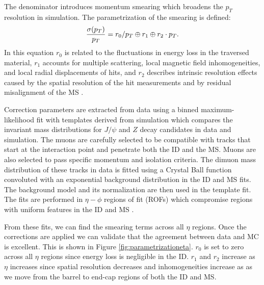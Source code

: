 \par \hspace{20pt} The denominator introduces momentum smearing which broadens the $p_T$ resolution in simulation. The parametrization of the smearing is defined:
\begin{align*}
	\centering 
    \frac{\sigma(p_T)}{p_T} = r_0/p_T \oplus r_1 \oplus r_2 \cdot p_T .
\end{align*}
In this equation $r_0$ is related to the fluctuations in energy loss in the traversed material, $r_1$ accounts for multiple scattering, local magnetic field inhomogeneities, and local radial displacements of hits, and $r_2$ describes intrinsic resolution effects caused by the spatial resolution of the hit measurements and by residual misalignment of the MS \cite{MCPpaper}. 

\par \hspace{20pt} Correction parameters are extracted from data using a binned maximum-likelihood fit with templates derived from simulation which compares the invariant mass distributions for $J/\psi$ and $Z$ decay candidates in data and simulation. The muons are carefully selected to be compatible with tracks that start at the interaction point and penetrate both the ID and the MS. Muons are also selected to pass specific momentum and isolation criteria. The dimuon mass distribution of these tracks in data is fitted using a Crystal Ball function convoluted with an exponential background distribution in the ID and MS fits. The background model and its normalization are then used in the template fit. The fits are performed in $\eta-\phi$ regions of fit (ROFs) which compromise regions with uniform features in the ID and MS \cite{MCPpaper}. 

\par \hspace{20pt} From these fits, we can find the smearing terms across all $\eta$ regions. Once the corrections are applied we can validate that the agreement between data and MC is excellent. This is shown in Figure \ref{fig:parametrizationeta}. $r_0$ is set to zero across all $\eta$ regions since energy loss is negligible in the ID. $r_1$ and $r_2$ increase as $\eta$ increases since spatial resolution decreases and inhomogeneities increase as as we move from the barrel to end-cap regions of both the ID and MS. 

